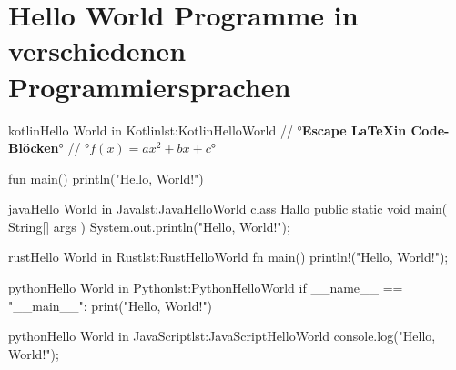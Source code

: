 

\chapter{Hello World Programme in verschiedenen Programmiersprachen}
\label{ch:HelloWorldProgrammeInVerschiedenenProgrammiersprachen}

\begin{code}{kotlin}{Hello World in Kotlin}{lst:KotlinHelloWorld}
    // °\textbf{\color{red}Escape \LaTeX in Code-Blöcken}°
    // °$f(x) = ax^2 + bx + c$°

    fun main() {
        println("Hello, World!")
    }
\end{code}

\begin{code}{java}{Hello World in Java}{lst:JavaHelloWorld}
    class Hallo {
        public static void main( String[] args ) {
            System.out.println("Hello, World!");
        }
    }
\end{code}

\begin{code}{rust}{Hello World in Rust}{lst:RustHelloWorld}
    fn main() {
        println!("Hello, World!");
    }
\end{code}

\begin{code}{python}{Hello World in Python}{lst:PythonHelloWorld}
    if __name__ == "__main__":
        print("Hello, World!")
\end{code}

\begin{code}{python}{Hello World in JavaScript}{lst:JavaScriptHelloWorld}
    console.log("Hello, World!");
\end{code}
